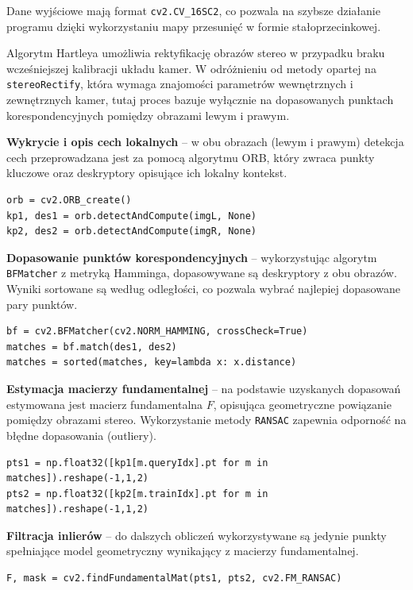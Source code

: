 \documentclass[magisterska]{pracadypl}
\begin{document}
Dane wyjściowe mają format \texttt{cv2.CV\_16SC2}, co pozwala na szybsze działanie programu dzięki wykorzystaniu mapy przesunięć w formie stałoprzecinkowej.

Algorytm Hartleya \cite{hartley} umożliwia rektyfikację obrazów stereo w przypadku braku wcześniejszej kalibracji układu kamer. W odróżnieniu od metody opartej na \texttt{stereoRectify}, która wymaga znajomości parametrów wewnętrznych i zewnętrznych kamer, tutaj proces bazuje wyłącznie na dopasowanych punktach korespondencyjnych pomiędzy obrazami lewym i prawym.

\textbf{Wykrycie i opis cech lokalnych} – w obu obrazach (lewym i prawym) detekcja cech przeprowadzana jest za pomocą algorytmu ORB, który zwraca punkty kluczowe oraz deskryptory opisujące ich lokalny kontekst.

\begin{lstlisting}[style=mypython]
orb = cv2.ORB_create()
kp1, des1 = orb.detectAndCompute(imgL, None)
kp2, des2 = orb.detectAndCompute(imgR, None)
\end{lstlisting}

\textbf{Dopasowanie punktów korespondencyjnych} – wykorzystując algorytm \texttt{BFMatcher} z metryką Hamminga, dopasowywane są deskryptory z obu obrazów. Wyniki sortowane są według odległości, co pozwala wybrać najlepiej dopasowane pary punktów.

\begin{lstlisting}[style=mypython]
bf = cv2.BFMatcher(cv2.NORM_HAMMING, crossCheck=True)
matches = bf.match(des1, des2)
matches = sorted(matches, key=lambda x: x.distance)
\end{lstlisting}

\textbf{Estymacja macierzy fundamentalnej} – na podstawie uzyskanych dopasowań estymowana jest macierz fundamentalna $F$, opisująca geometryczne powiązanie pomiędzy obrazami stereo. Wykorzystanie metody \texttt{RANSAC} zapewnia odporność na błędne dopasowania (outliery).

\begin{lstlisting}[style=mypython]
pts1 = np.float32([kp1[m.queryIdx].pt for m in matches]).reshape(-1,1,2)
pts2 = np.float32([kp2[m.trainIdx].pt for m in matches]).reshape(-1,1,2)
\end{lstlisting}

\textbf{Filtracja inlierów} – do dalszych obliczeń wykorzystywane są jedynie punkty spełniające model geometryczny wynikający z macierzy fundamentalnej.

\begin{lstlisting}[style=mypython]
F, mask = cv2.findFundamentalMat(pts1, pts2, cv2.FM_RANSAC)
\end{lstlisting}
\end{document}
